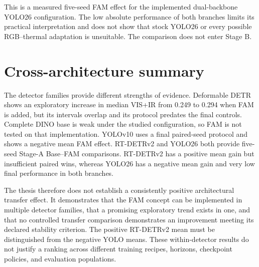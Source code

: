 This is a measured five-seed FAM effect for the implemented dual-backbone
YOLO26 configuration. The low absolute performance of both branches limits
its practical interpretation and does not show that stock YOLO26 or every
possible RGB--thermal adaptation is unsuitable. The comparison does not
enter Stage B.

\section{Cross-architecture summary}

The detector families provide different strengths of evidence.
Deformable DETR shows an exploratory increase in median VIS+IR from 0.249 to
0.294 when FAM is added, but its intervals overlap and its protocol predates
the final controls. Complete DINO base is weak under the studied configuration,
so FAM is not tested on that implementation. YOLOv10 uses a final paired-seed
protocol and shows a negative mean FAM effect. RT-DETRv2 and YOLO26 both
provide five-seed Stage-A Base--FAM comparisons. RT-DETRv2 has a positive
mean gain but insufficient paired wins, whereas YOLO26 has a negative mean
gain and very low final performance in both branches.

The thesis therefore does not establish a consistently positive architectural
transfer effect. It demonstrates that the FAM concept can be implemented in
multiple detector families, that a promising exploratory trend exists in one,
and that no controlled transfer comparison demonstrates an improvement
meeting its declared stability criterion. The positive RT-DETRv2 mean must
be distinguished from the negative YOLO means. These within-detector results
do not justify a ranking across different training recipes, horizons,
checkpoint policies, and evaluation populations.
